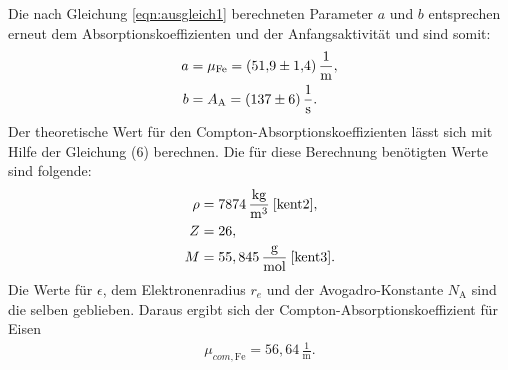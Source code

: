 \noindent Die nach Gleichung \eqref{eqn:ausgleich1} berechneten Parameter $a$ und $b$ entsprechen erneut dem Absorptionskoeffizienten und der Anfangsaktivität und sind somit:
\begin{align*}
a &= \mu_\text{Fe} = (\num{51.9 +- 1.4})\,\frac{1}{\si{\meter}} ,\\
b &= A_\text{A} = (\num{137 +- 6})\,\frac{1}{\si{\second}}.
\end{align*}
Der theoretische Wert für den Compton-Absorptionskoeffizienten lässt sich mit Hilfe der Gleichung (6) berechnen.
Die für diese Berechnung benötigten Werte sind folgende:
\begin{align*}
\rho &= 7874\,\frac{\si{\kilo\gram}}{\si{\cubic\meter}}\:\text{\cite{kent2}},\\
Z &= 26 ,\\
M &= 55,845\,\frac{\si{\gram}}{\si{\mol}}\: \text{\cite{kent3}}.
\end{align*}
Die Werte für $\epsilon$, dem Elektronenradius $r_e$ und der Avogadro-Konstante $N_\text{A}$ sind die selben geblieben.
Daraus ergibt sich der Compton-Absorptionskoeffizient für Eisen
\begin{align*}
  \mu_{com, \text{Fe}} = 56,64\,\frac{1}{\si{\meter}}.
\end{align*}

